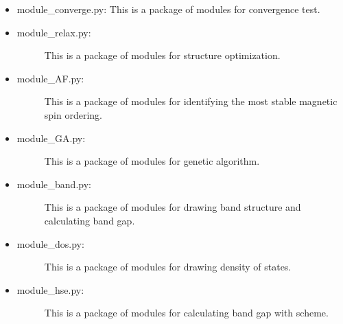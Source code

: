 \documentclass[letterpaper,10pt,english]{sphinxmanual}
\begin{document}
\begin{itemize}
\begin{description}
\end{description}

\item {} 
module\_converge.py: This is a package of modules for convergence test.

\item {} \begin{description}
\item[{module\_relax.py:}] \leavevmode
This is a package of modules for structure optimization.

\end{description}

\item {} \begin{description}
\item[{module\_AF.py:}] \leavevmode
This is a package of modules for identifying the most stable magnetic spin ordering.

\end{description}

\item {} \begin{description}
\item[{module\_GA.py:}] \leavevmode
This is a package of modules for genetic algorithm.

\end{description}

\item {} \begin{description}
\item[{module\_band.py:}] \leavevmode
This is a package of modules for drawing band structure and calculating band gap.

\end{description}

\item {} \begin{description}
\item[{module\_dos.py:}] \leavevmode
This is a package of modules for drawing density of states.

\end{description}

\item {} \begin{description}
\item[{module\_hse.py:}] \leavevmode
This is a package of modules for calculating band gap with  scheme.

\end{description}


\end{itemize}
\end{document}

